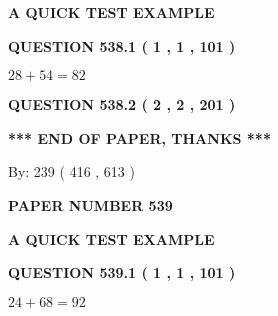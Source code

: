 \documentclass[12pt]{article}
\begin{document}
   
   
   
   
   
 \vspace{0.2in}
{\LARGE {\textbf{ A QUICK TEST EXAMPLE}}}
   
   
  
\vspace{0.2in}
  
{\textbf{\Large{QUESTION
538.1 
 ( 1 , 1 , 101 )
}}}
  
  
 
 

$ %
28 +  %
54=   %
82$
 
 
  
\vspace{0.2in}
  
{\textbf{\Large{QUESTION
538.2 
 ( 2 , 2 , 201 )
}}}
  
  
   
   
 \vspace{0.2in}
 
   
   
   
   
\vspace{1.0in} 
{\textbf{\large{ *** END OF PAPER, THANKS *** }}} 
   
   
\hspace{1.0in} By: 
 239 ( 416 ,  613 )
   
   
   
   
\newpage 
\setcounter{page}{ 
   539001 } 
   
   
   
   
 {\textbf{ \Large{ PAPER NUMBER  539  }}}
   
   
\vspace{0.2in}
   
   
   
   
   
   
 \vspace{0.2in}
{\LARGE {\textbf{ A QUICK TEST EXAMPLE}}}
   
   
  
\vspace{0.2in}
  
{\textbf{\Large{QUESTION
539.1 
 ( 1 , 1 , 101 )
}}}
  
  
 
 

$ %
24 +  %
68=   %
92$
 
\end{document}
